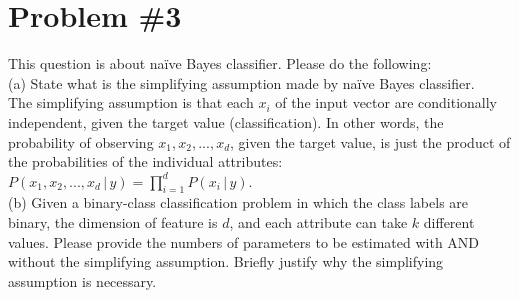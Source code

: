 \documentclass[12pt]{article}
\begin{document}
	
	\section*{Problem \#3}
	This question is about na\"ive Bayes classifier. Please do the following: \\
	(a) State what is the simplifying assumption made by na\"ive Bayes classifier. \\
	The simplifying assumption is that each $x_i$ of the input vector are conditionally independent, given the target value (classification). In other words, the probability of observing $x_{1}, x_{2}, ..., x_{d}$, given the target value, is just the product of the probabilities of the individual attributes: $P(x_{1}, x_{2}, ..., x_{d} \, \vert \, y) = \prod_{i=1}^{d}P(x_{i} \, \vert \, y)$. \\
	(b) Given a binary-class  classification  problem  in  which the  class  labels  are  binary,  the  dimension  of feature is $d$, and each attribute can take $k$ different values. Please provide the numbers of parameters to  be  estimated  with  AND  without  the  simplifying  assumption. Briefly  justify  why the  simplifying assumption is necessary. \\
\end{document}
